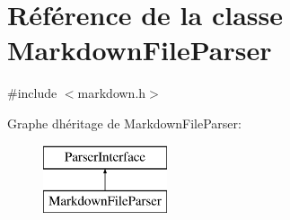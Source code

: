 \hypertarget{class_markdown_file_parser}{}\section{Référence de la classe Markdown\+File\+Parser}
\label{class_markdown_file_parser}


{\ttfamily \#include $<$markdown.\+h$>$}

Graphe d\textquotesingle{}héritage de Markdown\+File\+Parser\+:\begin{figure}[H]
\begin{center}
\leavevmode
\includegraphics[height=2.000000cm]{class_markdown_file_parser}
\end{center}
\end{figure}
